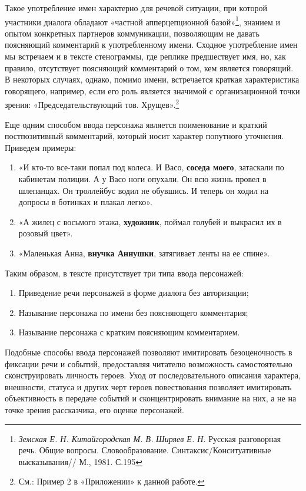\documentclass{kursa4}
\begin{document}
{        Такое употребление имен характерно для речевой ситуации, при которой участники диалога обладают «частной апперцепционной базой»\footnote{\textit{Земская Е. Н. Китайгородская М. В. }\textit{Ширяев Е. Н. }Русская разговорная речь. Общие вопросы. Словообразование. Синтаксис/Конситуативные высказывания// М., 1981. С.195}, знанием и опытом конкретных партнеров коммуникации, позволяющим не давать поясняющий комментарий к употребленному имени. Сходное употребление имен мы встречаем и в тексте стенограммы, где реплике предшествует имя, но, как правило, отсутствует поясняющий комментарий о том, кем является говорящий. В некоторых случаях, однако, помимо имени, встречается краткая характеристика говорящего, например, если его роль является значимой с организационной точки зрения: «Председательствующий тов. Хрущев».\footnote{См.: Пример 2 в «Приложении» к данной работе.} 

        Еще одним способом ввода персонажа является поименование и краткий постпозитивный комментарий, который носит характер попутного уточнения. Приведем примеры: \begin{enumerate}
          \item «И кто-то все-таки попал под колеса. И Васо, \textbf{соседа моего}, затаскали по кабинетам полиции. А у Васо ноги опухали. Он всю жизнь провел в шлепанцах. Он троллейбус водил не обувшись. И теперь он ходил на допросы в ботинках и плакал легко». \item «А жилец с восьмого этажа, \textbf{художник}, поймал голубей и выкрасил их в розовый цвет». \item «Маленькая Анна, \textbf{внучка Аннушки}, затягивает ленты на ее спине». \end{enumerate}

        Таким образом, в тексте присутствует три типа ввода персонажей: 

        \begin{enumerate}
          \item Приведение речи персонажей в форме диалога без авторизации; \item Называние персонажа по имени без поясняющего комментария; \item Называние персонажа с кратким поясняющим комментарием. \end{enumerate}

        Подобные способы ввода персонажей позволяют имитировать безоценочность в фиксации речи и событий, предоставляя читателю возможность самостоятельно сконструировать личность героев. Уход от последовательного описания характера, внешности, статуса и других черт героев повествования позволяет имитировать объективность в передаче событий и сконцентрировать внимание на них, а не на точке зрения рассказчика, его оценке персонажей. 

}
\end{document}
